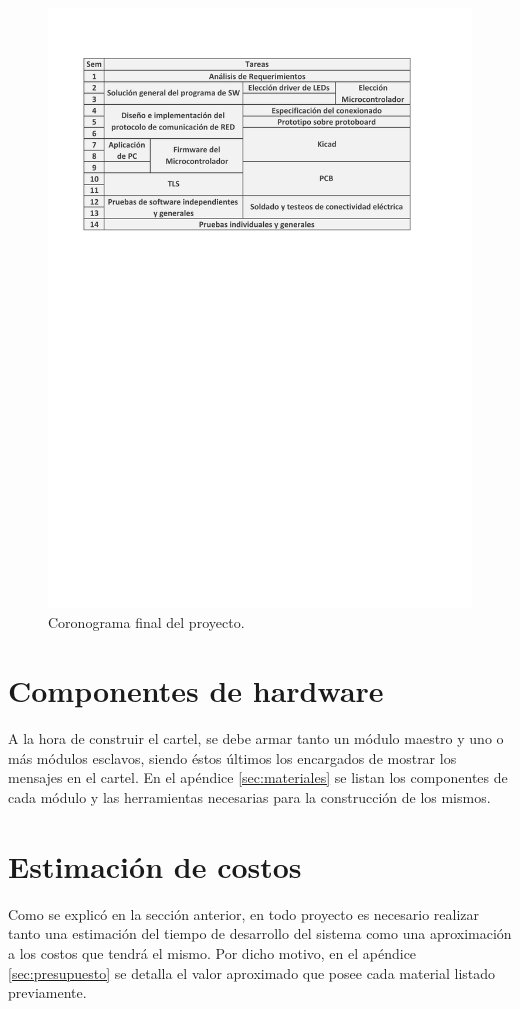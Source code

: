 \begin{figure}[ht!]
	\begin{center}
		\centering
		\includegraphics[width=\linewidth]{tablas/cronograma-v2.pdf}
		\caption{Coronograma final del proyecto.}
		\label{fig:cronograma}
	\end{center}
\end{figure}

\section{Componentes de hardware}
A la hora de construir el cartel, se debe armar tanto un módulo maestro y uno o más módulos esclavos, siendo éstos últimos los encargados de mostrar los mensajes en el cartel.
En el apéndice \ref{sec:materiales} se listan los componentes de cada módulo y las herramientas necesarias para la construcción de los mismos.


\section{Estimación de costos}
Como se explicó en la sección anterior, en todo proyecto es necesario realizar tanto una estimación del tiempo de desarrollo del sistema como una aproximación a los costos que tendrá el mismo.
Por dicho motivo, en el apéndice \ref{sec:presupuesto} se detalla el valor aproximado que posee cada material listado previamente.